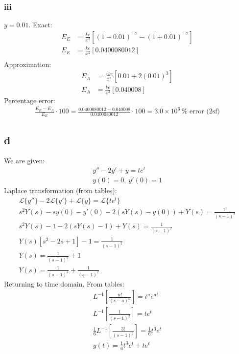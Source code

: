 \documentclass[11pt]{article}
\numberwithin{equation}{section}
\begin{document}
\subsubsection*{iii}
$y = 0.01$. Exact:
\begin{align}
	E_E &= \frac{ke}{x^2} \left[\left(1-0.01\right)^{-2}-\left(1+0.01\right)^{-2}\right]\\
	E_E &= \frac{ke}{x^2} \left[0.0400080012\right]\\
\end{align}
Approximation:
\begin{align}
	E_A &= \frac{4ke}{x^2} \left[0.01 + 2\left(0.01\right)^3\right]\\
	E_A &= \frac{ke}{x^2} \left[0.040008\right]
\end{align}
Percentage error:
\begin{align}
	\frac{E_E - E_A}{E_E} \cdot 100 = \frac{0.0400080012 - 0.040008}{0.0400080012} \cdot 100 = 3.0\times 10^6\, \% \textrm{ error (2sf)}
\end{align}
\subsection*{d}
We are given:
\begin{align}
	y'' - 2y' + y = te^t\\
	y(0) = 0, \ y'(0)=1
\end{align}
Laplace transformation (from tables):
\begin{gather}
	\mathcal{L} \{ y''\} - 2\mathcal{L} \{ y'\} + \mathcal{L} \{ y\} = \mathcal{L} \{te^t \}\\
	s^2 Y(s) - sy(0) - y'(0) - 2\left(sY(s) - y(0)\right) + Y(s) = \frac{1!}{\left(s-1\right)^2}\\
	s^2 Y(s) -1 -2(sY(s) - 1) + Y(s) = \frac{1}{\left(s-1\right)^2}\\
	Y(s)\left[s^2-2s+1\right] -1 = \frac{1}{\left(s-1\right)^2}\\
	Y(s) = \frac{1}{\left(s-1\right)^2} + 1\\
	Y(s) = \frac{1}{\left(s-1\right)^4} + \frac{1}{\left(s-1\right)^2}
\end{gather}
Returning to time domain. From tables:
\begin{gather}
	L^{-1}\left[\frac{n!}{\left(s-a\right)^n}\right] = t^ne^{at}\\
	L^{-1}\left[\frac{1}{\left(s-1\right)^2}\right] = te^t\\
	\frac{1}{6}L^{-1}\left[\frac{3!}{\left(s-1\right)^2}\right] = \frac{1}{6}t^3e^t\\
	y(t) = \frac{1}{6}t^3e^t + te^t
\end{gather}
\end{document}
